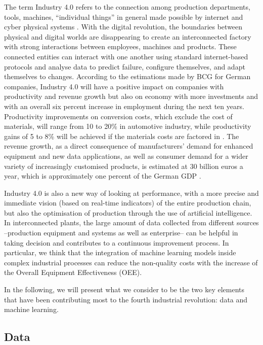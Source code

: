 The term Industry 4.0 refers to the connection among production departments, tools, machines, “individual things” in general made possible by internet and cyber physical systems \citep{schlapfer2015industry}.
With the digital revolution, the boundaries between physical and digital worlds are disappearing to create an interconnected factory with strong interactions between employees, machines and products. These connected entities can interact with one another using standard internet-based protocols and analyse data to predict failure, configure themselves, and adapt themselves to changes.
According to the estimations made by BCG for German companies, Industry 4.0 will have a positive impact on companies with productivity and revenue growth but also on economy with more investments and with an overall six percent increase in employment during the next ten years. Productivity improvements on conversion costs, which exclude the cost of materials, will range from 10 to 20\% in automotive industry, while productivity gains of 5 to 8\% will be achieved if the materials costs are factored in \citep{lorenz2016time}. The revenue growth, as a direct consequence of  manufacturers' demand for enhanced equipment and new data applications, as well as consumer demand for a wider variety of increasingly customised products, is estimated at 30 billion euros a year, which is approximately one percent of the German GDP \citep{russmann2015industry}. 

Industry 4.0 is also a new way of looking at performance, with a more precise and immediate vision (based on real-time indicators) of the entire production chain, but also the optimisation of production through the use of artificial intelligence. In interconnected plants, the large amount of data collected from different sources --production equipment and systems as well as enterprise-- can be helpful in taking decision and contributes to a continuous improvement process. In particular, we think that the integration of machine learning models inside complex industrial processes can reduce the non-quality costs with the increase of the Overall Equipment Effectiveness (OEE). 

In the following, we will present what we consider to be the two key elements that have been contributing most to the fourth industrial revolution: data and machine learning.


\subsection{Data}

